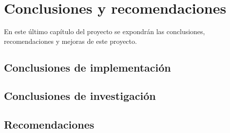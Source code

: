 \chapter{Conclusiones y recomendaciones}
\label{ch:conclusiones}

En este último capítulo del proyecto se expondrán las conclusiones, recomendaciones y mejoras de este proyecto.

\section{Conclusiones de implementación}
\label{sec:conc_implementacion}



\section{Conclusiones de investigación}
\label{sec:conc_investigacion}



\section{Recomendaciones}
\label{sec:recomendaciones}


